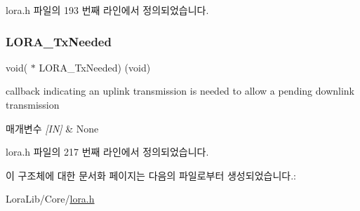lora.\+h 파일의 193 번째 라인에서 정의되었습니다.

\mbox{\label{structs_lo_ra_main_callback_a1155e4044eaa6ca31a53fc0d14d9414b}} 
\subsubsection{\texorpdfstring{L\+O\+R\+A\+\_\+\+Tx\+Needed}{LORA\_TxNeeded}}
{\footnotesize\ttfamily void( $\ast$ L\+O\+R\+A\+\_\+\+Tx\+Needed) (void)}



callback indicating an uplink transmission is needed to allow a pending downlink transmission 


\begin{DoxyParams}{매개변수}
{\em \mbox{[}\+I\+N\mbox{]}} & None \\
\hline
\end{DoxyParams}


lora.\+h 파일의 217 번째 라인에서 정의되었습니다.



이 구조체에 대한 문서화 페이지는 다음의 파일로부터 생성되었습니다.\+:\begin{DoxyCompactItemize}
\item 
Lora\+Lib/\+Core/\mbox{\hyperlink{lora_8h}{lora.\+h}}\end{DoxyCompactItemize}
